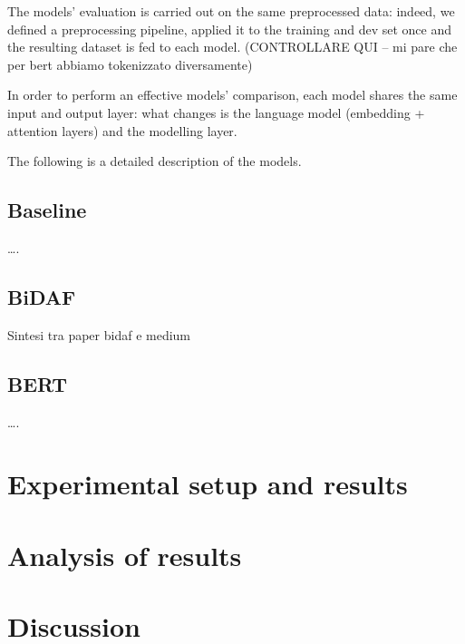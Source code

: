 \documentclass[a4paper,10pt]{report}
\begin{document}
The models’ evaluation is carried out on the same preprocessed data: indeed, we defined a preprocessing pipeline, applied it to the training and dev set once and the resulting dataset is fed to each model. (CONTROLLARE QUI – mi pare che per bert abbiamo tokenizzato diversamente)

In order to perform an effective models’ comparison, each model shares the same input and output layer: what changes is the language model (embedding + attention layers) and the modelling layer.

The following is a detailed description of the models.

\section{Baseline}\label{sec:baseline}

….

\section{BiDAF}\label{sec:bidaf}

Sintesi tra paper bidaf e medium

\section{BERT}\label{sec:bert}

….

\chapter{Experimental setup and results}\label{chap:experiments}

\chapter{Analysis of results}\label{chap:analysis-results}

\chapter{Discussion}\label{chap:discussion}

\printbibliography
\end{document}
